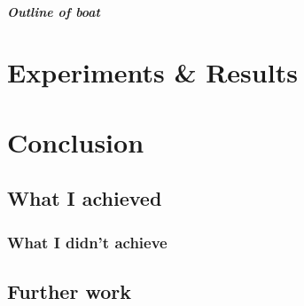     \paragraph{Outline of boat}


\chapter{Experiments \& Results}

      
\chapter{Conclusion}
  \section{What I achieved}
    \subsection{What I didn't achieve}
    
  \section{Further work}